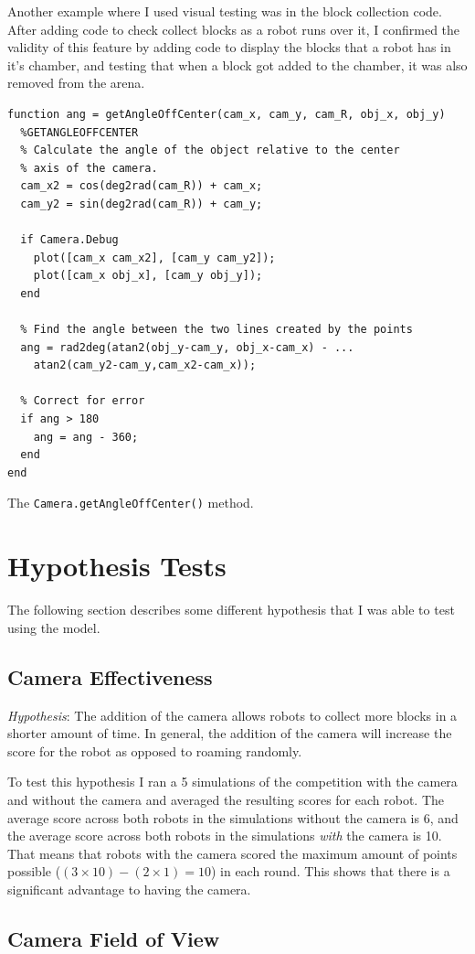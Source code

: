 \documentclass[12pt]{article}
\begin{document}
Another example where I used visual testing was in the block collection code. After adding code to check collect blocks as a robot runs over it, I confirmed the validity of this feature by adding code to display the blocks that a robot has in it's chamber, and testing that when a block got added to the chamber, it was also removed from the arena.

\begin{listing}[ht]
\begin{verbatim}
function ang = getAngleOffCenter(cam_x, cam_y, cam_R, obj_x, obj_y)
  %GETANGLEOFFCENTER
  % Calculate the angle of the object relative to the center
  % axis of the camera.
  cam_x2 = cos(deg2rad(cam_R)) + cam_x;
  cam_y2 = sin(deg2rad(cam_R)) + cam_y;
  
  if Camera.Debug
    plot([cam_x cam_x2], [cam_y cam_y2]);
    plot([cam_x obj_x], [cam_y obj_y]);
  end
  
  % Find the angle between the two lines created by the points
  ang = rad2deg(atan2(obj_y-cam_y, obj_x-cam_x) - ...
    atan2(cam_y2-cam_y,cam_x2-cam_x));
  
  % Correct for error
  if ang > 180
    ang = ang - 360;
  end
end
\end{verbatim}
\label{listing:getAngleOffCenter}
\caption{The \texttt{Camera.getAngleOffCenter()} method.}
\end{listing}

\section{Hypothesis Tests}
The following section describes some different hypothesis that I was able to test using the model. 

\subsection{Camera Effectiveness}
\textit{Hypothesis}: The addition of the camera allows robots to collect more blocks in a shorter amount of time. In general, the addition of the camera will increase the score for the robot as opposed to roaming randomly.

To test this hypothesis I ran a 5 simulations of the competition with the camera and without the camera and averaged the resulting scores for each robot. The average score across both robots in the simulations without the camera is 6, and the average score across both robots in the simulations \textit{with} the camera is 10. That means that robots with the camera scored the maximum amount of points possible ($(3 \times 10) - (2 \times 1) = 10$) in each round. This shows that there is a significant advantage to having the camera. 

\subsection{Camera Field of View}
\end{document}
